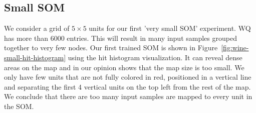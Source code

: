 \documentclass{acm_proc_article-sp}
\begin{document}
\subsection{Small SOM}

We consider a grid of $5\times5$ units for our first 'very small SOM' experiment. WQ has more than 6000 entries.
This will result in many input samples grouped together to very few nodes. Our first trained
SOM is shown in Figure~\ref{fig:wine-small-hit-histogram} using the hit histogram visualization.
It can reveal dense areas on the map and in our opinion shows that the map size is too small.
We only have few units that are not fully colored in red, positioned in a vertical line and separating
the first 4 vertical units on the top left from the rest of the map. We conclude that there are
too many input samples are mapped to every unit in the SOM.
\end{document}
